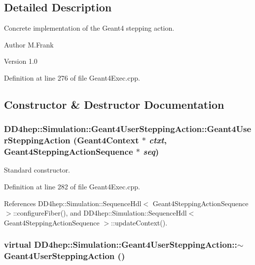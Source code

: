 \subsection{Detailed Description}
Concrete implementation of the Geant4 stepping action. \begin{DoxyAuthor}{Author}
M.Frank 
\end{DoxyAuthor}
\begin{DoxyVersion}{Version}
1.0 
\end{DoxyVersion}


Definition at line 276 of file Geant4Exec.cpp.

\subsection{Constructor \& Destructor Documentation}
\hypertarget{class_d_d4hep_1_1_simulation_1_1_geant4_user_stepping_action_a846e10589493c89d4ed2081312d17a1d}{
\subsubsection[{Geant4UserSteppingAction}]{\setlength{\rightskip}{0pt plus 5cm}DD4hep::Simulation::Geant4UserSteppingAction::Geant4UserSteppingAction ({\bf Geant4Context} $\ast$ {\em ctxt}, \/  {\bf Geant4SteppingActionSequence} $\ast$ {\em seq})}}
\label{class_d_d4hep_1_1_simulation_1_1_geant4_user_stepping_action_a846e10589493c89d4ed2081312d17a1d}


Standard constructor. 

Definition at line 282 of file Geant4Exec.cpp.

References DD4hep::Simulation::SequenceHdl$<$ Geant4SteppingActionSequence $>$::configureFiber(), and DD4hep::Simulation::SequenceHdl$<$ Geant4SteppingActionSequence $>$::updateContext().\hypertarget{class_d_d4hep_1_1_simulation_1_1_geant4_user_stepping_action_a7c9e7f202db5ebf3300c1d2c6d9aa1d2}{
\subsubsection[{$\sim$Geant4UserSteppingAction}]{\setlength{\rightskip}{0pt plus 5cm}virtual DD4hep::Simulation::Geant4UserSteppingAction::$\sim$Geant4UserSteppingAction ()}}
\label{class_d_d4hep_1_1_simulation_1_1_geant4_user_stepping_action_a7c9e7f202db5ebf3300c1d2c6d9aa1d2}


